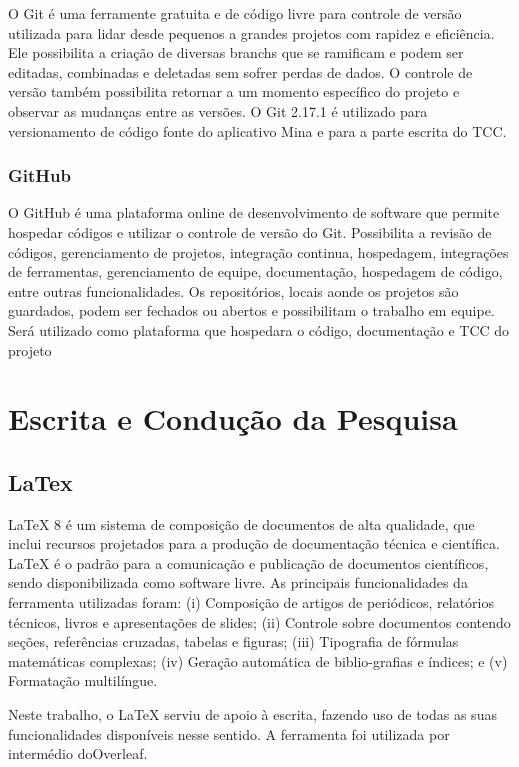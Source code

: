O Git \cite{git2020} é uma ferramente gratuita e de código livre para controle de versão utilizada para lidar desde pequenos a grandes projetos com rapidez e eficiência. Ele possibilita a criação de diversas branchs que se ramificam e podem ser editadas, combinadas e deletadas sem sofrer perdas de dados. O controle de versão também possibilita retornar a um momento específico do projeto e observar as mudanças entre as versões. O Git 2.17.1 é utilizado para versionamento de código fonte do aplicativo Mina e para a parte escrita do TCC.


\subsubsection{GitHub}

O GitHub \cite{github2020} é uma plataforma online de desenvolvimento de software que permite hospedar códigos e utilizar o controle de versão do Git. Possibilita a revisão de códigos, gerenciamento de projetos, integração continua, hospedagem, integrações de ferramentas, gerenciamento de equipe, documentação, hospedagem de código, entre outras funcionalidades. Os repositórios, locais aonde os projetos são guardados, podem ser fechados ou abertos e possibilitam o trabalho em equipe. Será utilizado como plataforma que hospedara o código, documentação e TCC do projeto

\section{Escrita e Condução da Pesquisa}

\subsection{LaTex}
LaTeX 8 é um sistema de composição de documentos de alta qualidade, que inclui recursos projetados para a produção de documentação técnica e científica. LaTeX é o padrão para a comunicação e publicação de documentos científicos, sendo disponibilizada como software livre. As principais funcionalidades da ferramenta utilizadas foram:
(i) Composição de artigos de periódicos, relatórios técnicos, livros e apresentações de slides;
(ii) Controle sobre documentos contendo seções, referências cruzadas, tabelas e figuras;
(iii) Tipografia de fórmulas matemáticas complexas; (iv) Geração automática de biblio-grafias e índices; e (v) Formatação multilíngue.

Neste trabalho, o LaTeX serviu de apoio à escrita, fazendo uso de todas as suas funcionalidades disponíveis nesse sentido. A ferramenta foi utilizada por intermédio doOverleaf.
